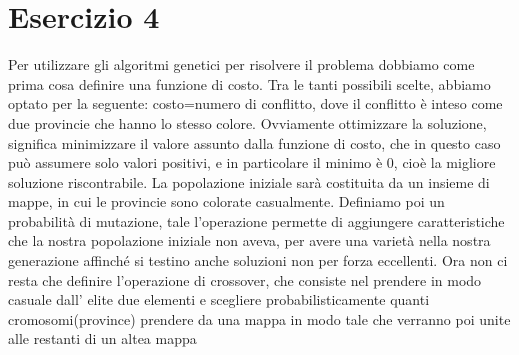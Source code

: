 	\section{Esercizio 4}
		\label{sec:es4}
		Per utilizzare gli algoritmi genetici per risolvere il problema dobbiamo come prima cosa definire una funzione di costo. Tra le tanti possibili scelte, abbiamo optato per la seguente: costo=numero di conflitto, dove il conflitto è inteso come due provincie che hanno lo stesso colore.
		Ovviamente ottimizzare la soluzione, significa minimizzare il valore assunto dalla funzione di costo, che in questo caso può assumere solo valori positivi, e in particolare il minimo è 0, cioè la migliore soluzione riscontrabile.
		La popolazione iniziale sarà costituita da un insieme di mappe, in cui le provincie sono colorate casualmente.
		Definiamo poi un probabilità di mutazione, tale l'operazione permette di aggiungere caratteristiche che la nostra popolazione iniziale non aveva, per avere una varietà nella nostra generazione affinché si testino anche soluzioni non per forza eccellenti.
		Ora non ci resta che definire l'operazione di crossover,  che consiste nel prendere in modo casuale dall' elite due elementi e scegliere probabilisticamente quanti cromosomi(province) prendere da una mappa in modo tale che verranno poi unite alle restanti di un altea mappa
		